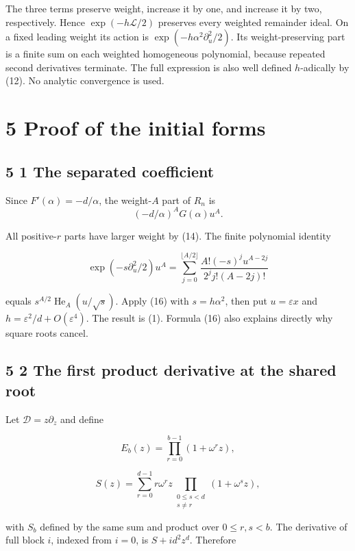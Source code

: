 \documentclass[
  11pt,
]{article}
\begin{document}
The three terms preserve weight, increase it by one, and increase it by
two, respectively. Hence \(\exp(-h\mathcal L/2)\) preserves every
weighted remainder ideal. On a fixed leading weight its action is
\(\exp(-h\alpha^2\partial_u^2/2)\). Its weight-preserving part is a
finite sum on each weighted homogeneous polynomial, because repeated
second derivatives terminate. The full expression is also well defined
\(h\)-adically by (12). No analytic convergence is used.

\section{5 Proof of the initial forms}\label{proof-of-the-initial-forms}

\subsection{5 1 The separated
coefficient}\label{the-separated-coefficient}

Since \(F'(\alpha)=-d/\alpha\), the weight-\(A\) part of \(R_n\) is
\nopagebreak[4]
\[
(-d/\alpha)^A G(\alpha)u^A.
\]

All positive-\(r\) parts have larger weight by (14). The finite
polynomial identity

\[
\exp(-s\partial_u^2/2)u^A
=\sum_{j=0}^{\lfloor A/2\rfloor}
\frac{A!(-s)^j u^{A-2j}}{2^j j!(A-2j)!} \tag{16}
\]

equals \(s^{A/2}\operatorname{He}_A(u/\sqrt s)\). Apply (16) with
\(s=h\alpha^2\), then put \(u=\varepsilon x\) and
\(h=\varepsilon^2/d+O(\varepsilon^4)\). The result is (1). Formula (16)
also explains directly why square roots cancel.

\subsection{5 2 The first product derivative at the shared
root}\label{the-first-product-derivative-at-the-shared-root}

Let \(\mathcal D=z\partial_z\) and define

\[
E_b(z)=\prod_{r=0}^{b-1}(1+\omega^rz),
\]

\[
S(z)=\sum_{r=0}^{d-1}r\omega^rz
\prod_{\substack{0\leq s<d\\s\ne r}}(1+\omega^sz),
\]

with \(S_b\) defined by the same sum and product over \(0\leq r,s<b\).
The derivative of full block \(i\), indexed from \(i=0\), is
\(S+id^2z^d\). Therefore
\end{document}
